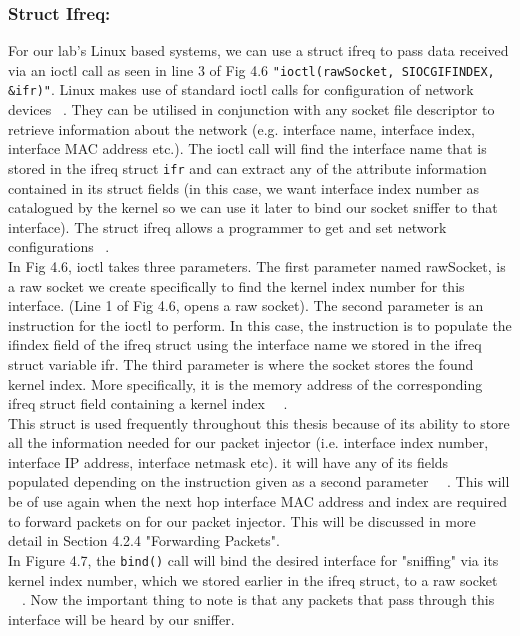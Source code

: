 \subsubsection*{Struct Ifreq:}
For our lab's Linux based systems, we can use a struct ifreq to pass data received via an ioctl call as seen in line 3 of Fig 4.6 {\tt "ioctl(rawSocket, SIOCGIFINDEX, \&ifr)"}. Linux makes use of standard ioctl calls for configuration of network devices ~\cite{40}. They can be utilised in conjunction with any socket file descriptor to retrieve information about the network (e.g. interface name, interface index, interface MAC address etc.). The ioctl call will find the interface name that is stored in the ifreq struct {\tt ifr} and can extract any of the attribute information contained in its struct fields (in this case, we want interface index number as catalogued by the kernel so we can use it later to bind our socket sniffer to that interface). The struct ifreq allows a programmer to get and set network configurations ~\cite{40}. \\

In Fig 4.6, ioctl takes three parameters. The first parameter named rawSocket, is a raw socket we create specifically to find the kernel index number for this interface. (Line 1 of Fig 4.6, opens a raw socket). The second parameter is an instruction for the ioctl to perform. In this case, the instruction is to populate the if\textunderscore index field of the ifreq struct using the interface name we stored in the ifreq struct variable ifr. The third parameter is where the socket stores the found kernel index. More specifically, it is the memory address of the corresponding ifreq struct field containing a kernel index ~\cite{35}~\cite{40}. \\

This struct is used frequently throughout this thesis because of its ability to store all the information needed for our packet injector (i.e. interface index number, interface IP address, interface netmask etc). it will have any of its fields populated depending on the instruction given as a second parameter ~\cite{35}~\cite{40}. This will be of use again when the next hop interface MAC address and index are required to forward packets on for our packet injector. This will be discussed in more detail in Section 4.2.4 "Forwarding Packets".\\
 
In Figure 4.7, the {\tt bind()} call will bind the desired interface for "sniffing" via its kernel index number, which we stored earlier in the ifreq struct, to a raw socket ~\cite{35}~\cite{40}. Now the important thing to note is that any packets that pass through this interface will be heard by our sniffer. \\


